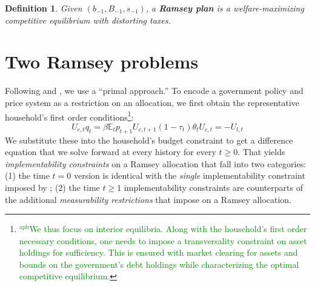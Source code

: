 \documentclass[12pt]{article}
\newcommand{\apb}[1]{\textcolor{green}{$^{\textrm{apb}}${#1}}}
\newcommand{\EE}{\mathbb E}
\newtheorem{definition}[theorem]{Definition}
\begin{document}
\begin{definition}
Given $\left( b_{-1},B_{-1},s_{-1}\right) $, a \textbf{Ramsey plan} is a welfare-maximizing competitive
equilibrium with distorting taxes.
\end{definition}


\section{Two Ramsey problems}

Following \citet{LucasJr.1983}
and
\citet{Aiyagari2002}, we use a
``primal approach.''   To encode a  government policy and price system as a restriction on an allocation,
we  first obtain   the representative household's first order conditions\footnote{\apb{We thus focus on interior equilibria. Along with the household's first order necessary conditions, one needs to impose a transversality constraint on asset holdings for sufficiency. This is ensured with market clearing for assets and bounds on the government's debt holdings while characterizing the optimal competitive equilibrium.}}:
\begin{subequations}
	\begin{equation}
	\label{eqn:Euler}
		U_{c,t} q_t = \beta \EE_t p_{t+1}U_{c,t+1} 
	\end{equation}
	\begin{equation}
		(1-\tau_t)\theta_tU_{c,t} = - U_{l,t} 
	\end{equation}


\end{subequations}
We substitute these into the household's budget constraint to get a difference equation that we  solve forward   at every history for every $t \geq 0$.
That yields \textit{implementability constraints} on a Ramsey allocation that fall into two categories: (1) the time $t=0$ version is identical
with the {\em single} implementability constraint imposed by \citet{LucasJr.1983}; (2) the time $t \geq 1$ implementability constraints
are counterparts  of the additional
 \emph{measurability restrictions} that \citet{Aiyagari2002} impose on  a Ramsey allocation.
%
\end{document}
